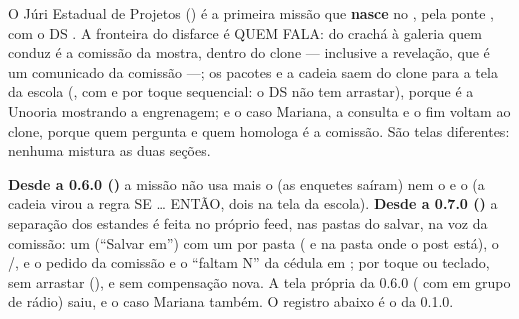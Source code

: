 O Júri Estadual de Projetos () é a primeira missão que
\textbf{nasce} no , pela ponte , com o DS
. A fronteira do disfarce é QUEM FALA: do crachá à
galeria quem conduz é a comissão da mostra, dentro do clone --- inclusive a
revelação, que é um comunicado da comissão ---; os pacotes e a cadeia saem do
clone para a tela da escola (, com  e
 por toque sequencial: o DS não tem arrastar), porque é a
Unooria mostrando a engrenagem; e o caso Mariana, a consulta e o fim voltam ao
clone, porque quem pergunta e quem homologa é a comissão. São telas diferentes:
nenhuma mistura as duas seções.

\begin{nota}
\textbf{Desde a 0.6.0 ()} a missão não usa mais o
 (as enquetes saíram) nem o  e o
 (a cadeia virou a regra SE \ldots{} ENTÃO, dois
 na tela da escola). \textbf{Desde a 0.7.0
()} a separação dos estandes é feita no próprio feed, nas pastas
do salvar, na voz da comissão: um  (\enquote{Salvar em}) com
um  por pasta ( e  na pasta onde o
post está), o  /, e o pedido da
comissão e o \enquote{faltam N} da cédula em ; por toque ou
teclado, sem arrastar (), e sem compensação nova. A tela própria
da 0.6.0 ( com  em grupo de rádio) saiu, e o caso
Mariana também. O registro abaixo é o da 0.1.0.
\end{nota}


